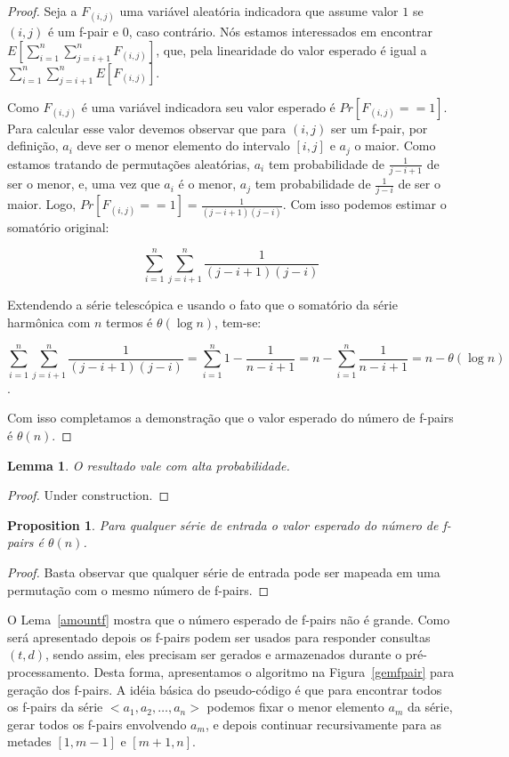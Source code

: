 \documentclass[12pt]{article}
\newtheorem{lem}[thm]{Lemma}
\newtheorem{prop}[thm]{Proposition}
\begin{document}
\begin{proof}
Seja a $F_{(i, j)}$ uma variável aleatória indicadora que assume valor
$1$ se $(i, j)$ é um f-pair e $0$, caso contrário. Nós estamos interessados
em encontrar $E[\sum_{i = 1}^n \sum_{j=i + 1}^n F_{(i, j)}]$, que, pela linearidade
do valor esperado é igual a $\sum_{i = 1}^n \sum_{j = i + 1}^n E[F_{(i, j)}]$.  

Como $F_{(i, j)}$ é uma variável indicadora seu valor esperado é $Pr[F_{(i,j)} == 1]$.
Para calcular esse valor devemos observar que para $(i, j)$ ser um f-pair, por definição,
$a_i$ deve ser o menor elemento do intervalo $[i, j]$ e $a_j$ o maior. Como estamos
tratando de permutações aleatórias, $a_i$ tem probabilidade de $\frac{1}{j - i + 1}$ de
ser o menor, e, uma vez que $a_i$ é o menor, $a_j$ tem probabilidade de $\frac{1}{j - i}$ de
ser o maior. Logo, $Pr[F_{(i, j)} == 1] = \frac{1}{(j - i + 1) (j - i)}$. Com isso podemos
estimar o somatório original:

$$\sum_{i = 1}^n \sum_{j = i + 1}^n  \frac{1}{(j - i + 1) (j - i)}$$

Extendendo a série telescópica e usando o fato que o somatório da série harmônica com $n$ termos é $\theta(\log n)$, tem-se:

$$\sum_{i = 1}^n \sum_{j = i + 1}^n  \frac{1}{(j - i + 1) (j - i)} = \sum_{i = 1}^n 1 - \frac{1}{n - i + 1} = n - \sum_{i = 1}^n \frac{1}{n - i + 1} = n - \theta(\log n)$$.

Com isso completamos a demonstração que o valor esperado do número de f-pairs é $\theta(n)$.
\end{proof}

\begin{lem}
O resultado vale com alta probabilidade.
\end{lem}

\begin{proof}
Under construction.
\end{proof}

\begin{prop}
Para qualquer série de entrada o valor esperado do número 
de f-pairs é $\theta(n)$.
\end{prop}
\begin{proof}
Basta observar que qualquer série de entrada pode ser mapeada em uma permutação
com o mesmo número de f-pairs.
\end{proof}

O Lema~\ref{amountf} mostra que o número esperado de f-pairs não é grande.
Como será apresentado depois os f-pairs podem ser usados para responder
consultas $(t, d)$, sendo assim, eles precisam ser gerados e armazenados
durante o pré-processamento. Desta forma, apresentamos o algoritmo na Figura~\ref{gemfpair} para geração
dos f-pairs. A idéia básica do pseudo-código é que para encontrar todos os f-pairs da
série $<a_1, a_2, \ldots, a_n>$ podemos fixar o menor elemento $a_m$ da série,
gerar todos os f-pairs envolvendo $a_m$, e depois continuar recursivamente para as metades $[1, m - 1]$ e $[m + 1, n]$.
\end{document}
